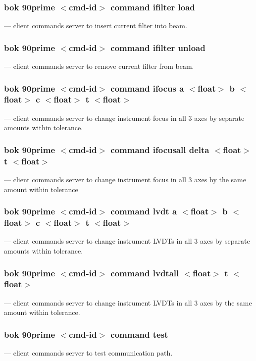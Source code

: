 \documentclass[12pt,twoside]{article}
\begin{document}
\subsubsection{bok 90prime $<$cmd-id$>$ command ifilter load}
  --- client commands server to insert current filter into beam.

\subsubsection{bok 90prime $<$cmd-id$>$ command ifilter unload}
  --- client commands server to remove current filter from beam.

\subsubsection{bok 90prime $<$cmd-id$>$ command ifocus a $<$float$>$ b $<$float$>$ c $<$float$>$ t $<$float$>$}
  --- client commands server to change instrument focus in all 3 axes by separate amounts within tolerance.

\subsubsection{bok 90prime $<$cmd-id$>$ command ifocusall delta $<$float$>$ t $<$float$>$}
  --- client commands server to change instrument focus in all 3 axes by the same amount within tolerance

\subsubsection{bok 90prime $<$cmd-id$>$ command lvdt a $<$float$>$ b $<$float$>$ c $<$float$>$ t $<$float$>$}
  --- client commands server to change instrument LVDTs in all 3 axes by separate amounts within tolerance.

\subsubsection{bok 90prime $<$cmd-id$>$ command lvdtall $<$float$>$ t $<$float$>$}
  --- client commands server to change instrument LVDTs in all 3 axes by the same amount within tolerance.
 
\subsubsection{bok 90prime $<$cmd-id$>$ command test}
  --- client commands server to test communication path.
 
\end{document}
